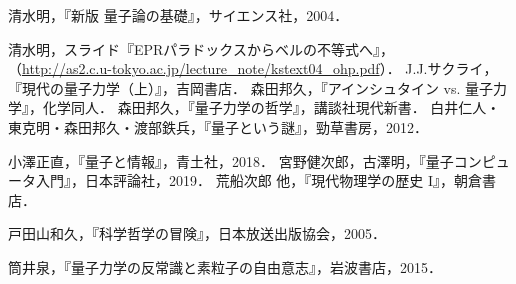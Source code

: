 \documentclass[10pt,b5paper,papersize,dvipdfmx]{jsbook}
\begin{document}
\begin{thebibliography}{99}
  \item 清水明，『新版 量子論の基礎』，サイエンス社，2004．
  \item 清水明，スライド『EPRパラドックスからベルの不等式へ』，\\
  （\url{http://as2.c.u-tokyo.ac.jp/lecture_note/kstext04_ohp.pdf}）．
   J.J.サクライ，『現代の量子力学（上）』，吉岡書店．
   森田邦久，『アインシュタイン vs. 量子力学』，化学同人．
   森田邦久，『量子力学の哲学』，講談社現代新書．
   白井仁人・東克明・森田邦久・渡部鉄兵，『量子という謎』，勁草書房，2012．
  \item 小澤正直，『量子と情報』，青土社，2018．
   宮野健次郎，古澤明，『量子コンピュータ入門』，日本評論社，2019．
   荒船次郎 他，『現代物理学の歴史 I』，朝倉書店．
  \item 戸田山和久，『科学哲学の冒険』，日本放送出版協会，2005．
  \item 筒井泉，『量子力学の反常識と素粒子の自由意志』，岩波書店，2015．
\end{thebibliography}
\end{document}
